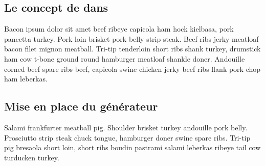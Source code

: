 \subsection{Le concept de \kwsoa dans \kwplay}

Bacon ipsum dolor sit amet beef ribeye capicola ham hock kielbasa, pork pancetta turkey. Pork loin brisket pork belly strip steak. Beef ribs jerky meatloaf bacon filet mignon meatball. Tri-tip tenderloin short ribs shank turkey, drumstick ham cow t-bone ground round hamburger meatloaf shankle doner. Andouille corned beef spare ribs beef, capicola swine chicken jerky beef ribs flank pork chop ham leberkas.

\subsection{Mise en place du générateur}

Salami frankfurter meatball pig. Shoulder brisket turkey andouille pork belly. Prosciutto strip steak chuck tongue, hamburger doner swine spare ribs. Tri-tip pig bresaola short loin, short ribs boudin pastrami salami leberkas ribeye tail cow turducken turkey.